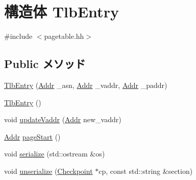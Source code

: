 \hypertarget{structAlphaISA_1_1TlbEntry}{
\section{構造体 TlbEntry}
\label{structAlphaISA_1_1TlbEntry}
}


{\ttfamily \#include $<$pagetable.hh$>$}\subsection*{Public メソッド}
\begin{DoxyCompactItemize}
\item 
\hyperlink{structAlphaISA_1_1TlbEntry_ad54289f363defd185361d4c812a4fca5}{TlbEntry} (\hyperlink{classm5_1_1params_1_1Addr}{Addr} \_\-asn, \hyperlink{classm5_1_1params_1_1Addr}{Addr} \_\-vaddr, \hyperlink{classm5_1_1params_1_1Addr}{Addr} \_\-paddr)
\item 
\hyperlink{structAlphaISA_1_1TlbEntry_ad069716fb78ffaa2d9bfba679a8eac9a}{TlbEntry} ()
\item 
void \hyperlink{structAlphaISA_1_1TlbEntry_a5b72666b92ee0adbe9a7d218a0343754}{updateVaddr} (\hyperlink{classm5_1_1params_1_1Addr}{Addr} new\_\-vaddr)
\item 
\hyperlink{classm5_1_1params_1_1Addr}{Addr} \hyperlink{structAlphaISA_1_1TlbEntry_a4f87fae41ff4bd27577a41dba3cf2b90}{pageStart} ()
\item 
void \hyperlink{structAlphaISA_1_1TlbEntry_a53e036786d17361be4c7320d39c99b84}{serialize} (std::ostream \&os)
\item 
void \hyperlink{structAlphaISA_1_1TlbEntry_af22e5d6d660b97db37003ac61ac4ee49}{unserialize} (\hyperlink{classCheckpoint}{Checkpoint} $\ast$cp, const std::string \&section)
\end{DoxyCompactItemize}
